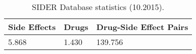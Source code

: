 \begin{table}[]
\caption{SIDER Database statistics (10.2015).}
\centering
\begin{tabular}{|l|l|l|}
\hline
\textbf{Side Effects} & \textbf{Drugs} & \textbf{Drug-Side Effect Pairs} \\ \hline
5.868        & 1.430 & 139.756 \\ \hline
\end{tabular}
\label{tab:sider_stats}
\end{table}